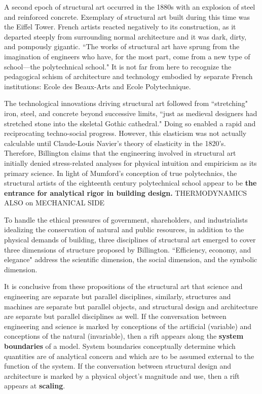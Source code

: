 A second epoch of structural art occurred in the 1880s with an explosion of steel and reinforced concrete. Exemplary of structural art built during this time was the Eiffel Tower. French artists reacted negatively to its construction, as it departed steeply from surrounding normal architecture and it was dark, dirty, and pompously gigantic. \cite{EIFFELTOWER} ``The works of structural art have sprung from the imagination of engineers who have, for the most part, come from a new type of school---the polytechnical school." \cite[p14]{TOWERANDBRIDGE} It is not far from here to recognize the pedagogical schism of architecture and technology embodied by separate French institutions: Ecole des Beaux-Arts and Ecole Polytechnique. \cite{SPACETIMEARCHITECTURE}

The technological innovations driving structural art followed from ``stretching" iron, steel, and concrete beyond successive limits, ``just as medieval designers had stretched stone into the skeletal Gothic cathedral." \cite[p5]{TOWERANDBRIDGE} Doing so enabled a rapid and reciprocating techno-social progress. However, this elasticism was not actually calculable until Claude-Louis Navier's theory of elasticity in the 1820's. \cite[p73]{RETROFITTINGMASONRY} Therefore, Billington claims that the engineering involved in structural art initially denied stress-related analyses for physical intuition and empiricism as its primary science. \cite[p43]{TOWERANDBRIDGE} In light of Mumford's conception of true polytechnics, the structural artists of the eighteenth century polytechnical school appear to be \textbf{the entrance for analytical rigor in building design.} THERMODYNAMICS ALSO on MECHANICAL SIDE


To handle the ethical pressures of government, shareholders, and industrialists idealizing the conservation of natural and public resources, in addition to the physical demands of building, three disciplines of structural art emerged to cover three dimensions of structure proposed by Billington. ``Efficiency, economy, and elegance" address the scientific dimension, the social dimension, and the symbolic dimension. \cite[p5,16,17]{TOWERANDBRIDGE}




It is conclusive from these propositions of the structural art that science and engineering are separate but parallel disciplines, similarly, structures and machines are separate but parallel objects, and structural design and architecture are separate but parallel disciplines as well. If the conversation between engineering and science is marked by conceptions of the artificial (variable) and conceptions of the natural (invariable), then a rift appears along the \textbf{system boundaries} of a model. System boundaries conceptually determine which quantities are of analytical concern and which are to be assumed external to the function of the system. If the conversation between structural design and architecture is marked by a physical object's magnitude and use, then a rift appears at \textbf{scaling}.

